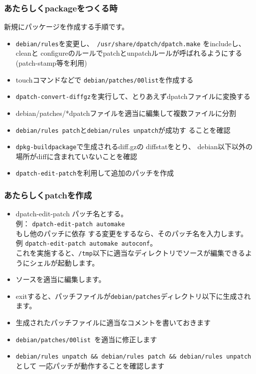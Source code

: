 \documentclass[mingoth,a4paper]{jsarticle}
\begin{document}
\subsubsection{あたらしくpackageをつくる時}

新規にパッケージを作成する手順です。

\begin{itemize}
 \item  {\tt debian/rules}を変更し、{\tt
	    /usr/share/dpatch/dpatch.make} をincludeし、 cleanと
	    configureのルールでpatchとunpatchルールが呼ばれるようにする
	    (patch-stamp等を利用)
 \item touchコマンドなどで {\tt debian/patches/00list}を作成する
 \item {\tt dpatch-convert-diffgz}を実行して、とりあえずdpatchファイルに変換する
 \item debian/patches/*dpatchファイルを適当に編集して複数ファイルに分割
 \item {\tt  debian/rules patch}と{\tt debian/rules unpatch}が成功す
	    ることを確認
 \item {\tt dpkg-buildpackage}で生成されるdiff.gzの
	    diffstatをとり、
	    debian以下以外の場所がdiffに含まれていないことを確認
 \item {\tt dpatch-edit-patch}を利用して追加のパッチを作成
\end{itemize}

\subsubsection{あたらしくpatchを作成}

\begin{itemize}
 
 \item dpatch-edit-patch パッチ名とする。 \\
       例：
       { \tt dpatch-edit-patch automake }  \\もし他のパッチに依存
 する変更をするなら、そのパッチ名を入力します。 \\ 例 {\tt dpatch-edit-patch
automake autoconf}。\\
       これを実施すると、{\tt /tmp}以下に適当なディレクトリでソースが編集できるようにシェルが起動します。
 \item  ソースを適当に編集します。
 \item  exitすると、パッチファイルが{\tt debian/patches}ディレクトリ以下に生成されます。
 \item  生成されたパッチファイルに適当なコメントを書いておきます
 \item  {\tt debian/patches/00list }を適当に修正します
 \item  {\tt debian/rules unpatch \&\& debian/rules patch \&\& debian/rules unpatch }として 一応パッチが動作することを確認します
\end{itemize}
\end{document}
